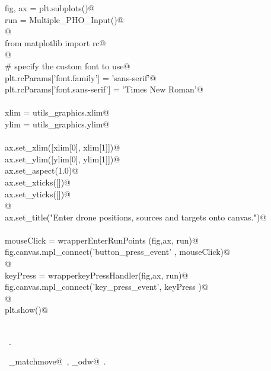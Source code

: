 \documentclass[10pt, english, oneside]{report}
\begin{document}
\begin{appendices}
\begin{flushleft}
\begin{list}{}{}
\mbox{}\verb@    fig, ax =  plt.subplots()@\\
\mbox{}\verb@    run = Multiple_PHO_Input()@\\
\mbox{}\verb@        @\\
\mbox{}\verb@    from matplotlib import rc@\\
\mbox{}\verb@    @\\
\mbox{}\verb@    # specify the custom font to use@\\
\mbox{}\verb@    plt.rcParams['font.family'] = 'sans-serif'@\\
\mbox{}\verb@    plt.rcParams['font.sans-serif'] = 'Times New Roman'@\\
\mbox{}\verb@@\\
\mbox{}\verb@    xlim = utils_graphics.xlim@\\
\mbox{}\verb@    ylim = utils_graphics.ylim@\\
\mbox{}\verb@@\\
\mbox{}\verb@    ax.set_xlim([xlim[0], xlim[1]])@\\
\mbox{}\verb@    ax.set_ylim([ylim[0], ylim[1]])@\\
\mbox{}\verb@    ax.set_aspect(1.0)@\\
\mbox{}\verb@    ax.set_xticks([])@\\
\mbox{}\verb@    ax.set_yticks([])@\\
\mbox{}\verb@          @\\
\mbox{}\verb@    ax.set_title("Enter drone positions, sources and targets onto canvas.")@\\
\mbox{}\verb@@\\
\mbox{}\verb@    mouseClick   = wrapperEnterRunPoints (fig,ax, run)@\\
\mbox{}\verb@    fig.canvas.mpl_connect('button_press_event' , mouseClick)@\\
\mbox{}\verb@          @\\
\mbox{}\verb@    keyPress     = wrapperkeyPressHandler(fig,ax, run)@\\
\mbox{}\verb@    fig.canvas.mpl_connect('key_press_event', keyPress   )@\\
\mbox{}\verb@    @\\
\mbox{}\verb@    plt.show()@\\
\mbox{}\verb@@\\
\mbox{}\verb@@{\NWsep}
\end{list}
\vspace{-1.5ex}
\footnotesize
\begin{list}{}{\setlength{\itemsep}{-\parsep}\setlength{\itemindent}{-\leftmargin}}
\item \NWtxtMacroRefIn\ .
\item \NWtxtIdentsUsed\nobreak\  \verb@algo_matchmove@\nobreak\ , \verb@algo_odw@\nobreak\ .
\item{}
\end{list}
\vspace{4ex}
\end{flushleft}


\end{appendices}
\end{document}
